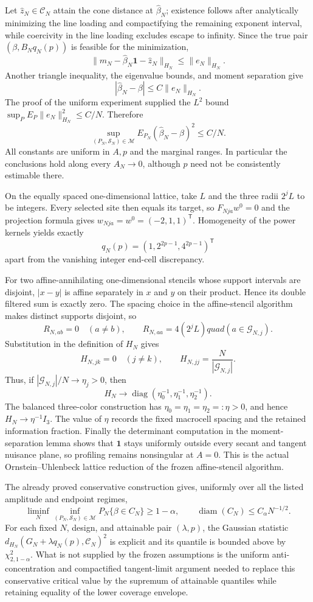 Let \(\widehat z_N\in\mathcal C_N\) attain the cone distance at \(\widehat\beta_N\); existence follows after analytically minimizing the line loading and compactifying the remaining exponent interval, while coercivity in the line loading excludes escape to infinity.  Since the true pair \((\beta,B_Nq_N(p))\) is feasible for the minimization,
\[
 \|m_N-\widehat\beta_N\mathbf1-\widehat z_N\|_{H_N}
 \le \|e_N\|_{H_N}.
\]
Another triangle inequality, the eigenvalue bounds, and moment separation give
\[
 |\widehat\beta_N-\beta|
 \le C\|e_N\|_{H_N}.
\]
The proof of the uniform experiment supplied the \(L^2\) bound
\(\sup_P E_P\|e_N\|_{H_N}^2\le C/N\).  Therefore
\[
 \sup_{(P_N,\mathcal S_N)\in\mathcal M}
 E_{P_N}(\widehat\beta_N-\beta)^2\le C/N.
\]
All constants are uniform in \(A,p\) and the marginal ranges.  In particular the conclusions hold along every \(A_N\to0\), although \(p\) need not be consistently estimable there.

On the equally spaced one-dimensional lattice, take \(L\) and the three radii \(2^jL\) to be integers.  Every selected site then equals its target, so \(F_{Nja}w^0=0\) and the projection formula gives \(w_{Nja}=w^0=(-2,1,1)^{\mathsf T}\).  Homogeneity of the power kernels yields exactly
\[
 q_N(p)=(1,2^{2p-1},4^{2p-1})^{\mathsf T}
\]
apart from the vanishing integer end-cell discrepancy.

For two affine-annihilating one-dimensional stencils whose support intervals are disjoint, \(|x-y|\) is affine separately in \(x\) and \(y\) on their product.  Hence its double filtered sum is exactly zero.  The spacing choice in the affine-stencil algorithm makes distinct supports disjoint, so
\[
 R_{N,ab}=0\quad(a\ne b),
 \qquad R_{N,aa}=4(2^jL)quad(a\in\mathcal G_{N,j}).
\]
Substitution in the definition of \(H_N\) gives
\[
 H_{N,jk}=0\quad(j\ne k),
 \qquad H_{N,jj}=\frac{N}{|\mathcal G_{N,j}|}.
\]
Thus, if \(|\mathcal G_{N,j}|/N\to\eta_j>0\), then
\[
 H_N\longrightarrow\operatorname{diag}(\eta_0^{-1},\eta_1^{-1},\eta_2^{-1}).
\]
The balanced three-color construction has \(\eta_0=\eta_1=\eta_2=:\eta>0\), and hence \(H_N\to\eta^{-1}I_3\).  The value of \(\eta\) records the fixed macrocell spacing and the retained information fraction.  Finally the determinant computation in the moment-separation lemma shows that \(\mathbf1\) stays uniformly outside every secant and tangent nuisance plane, so profiling remains nonsingular at \(A=0\).  This is the actual Ornstein--Uhlenbeck lattice reduction of the frozen affine-stencil algorithm.

The already proved conservative construction gives, uniformly over all the listed amplitude and endpoint regimes,
\[
 \liminf_N\inf_{(P_N,\mathcal S_N)\in\mathcal M}P_N\{\beta\in C_N\}\ge1-\alpha,
 \qquad \operatorname{diam}(C_N)\le C_\alpha N^{-1/2}.
\]
For each fixed \(N\), design, and attainable pair \((\lambda,p)\), the Gaussian statistic
\(d_{H_N}(G_N+\lambda q_N(p),\mathcal C_N)^2\) is explicit and its quantile is bounded above by \(\chi^2_{2,1-\alpha}\).  What is not supplied by the frozen assumptions is the uniform anti-concentration and compactified tangent-limit argument needed to replace this conservative critical value by the supremum of attainable quantiles while retaining equality of the lower coverage envelope.
